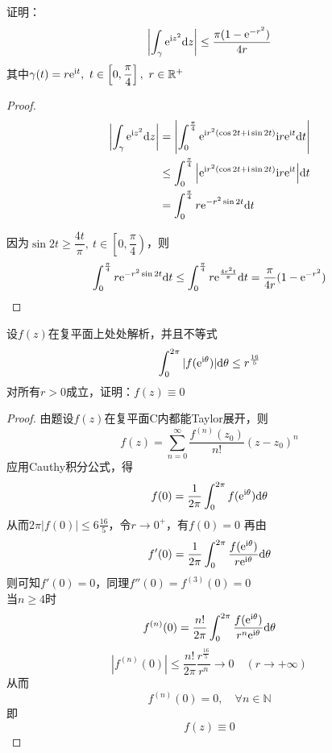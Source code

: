 \begin{proposition}

    证明：
    $$\left| \int_{\gamma}{\mathrm{e}^{\mathrm{i} z^2}}\mathrm{d} z \right| \leq \dfrac{\pi(1 - \mathrm{e}^{-r^2})}{4r}$$
    其中$\gamma(t) = r\mathrm{e}^{\mathrm{i} t},\ t\in \left[0,\dfrac{\pi}{4} \right],\ r \in \mathbb{R}^+$

\end{proposition}

\begin{proof}

    \begin{align*}
        \left| \int_{\gamma}{\mathrm{e}^{\mathrm{i} z^2}}\mathrm{d} z \right| & = \left| \int_{0}^{\frac{\pi}{4}}{\mathrm{e}^{\mathrm{i} r^2(\cos{2t} + \mathrm{i}\sin{2t})}\mathrm{i} r\mathrm{e}^{\mathrm{i} t}}\mathrm{d} t \right| \\
        & \leq \int_{0}^{\frac{\pi}{4}}{\left| \mathrm{e}^{\mathrm{i} r^2(\cos{2t} + \mathrm{i}\sin{2t})}\mathrm{i} r\mathrm{e}^{\mathrm{i} t} \right|}\mathrm{d} t \\
        & = \int_{0}^{\frac{\pi}{4}}{r\mathrm{e}^{-r^2\sin{2t}}}\mathrm{d} t
    \end{align*}

    因为$\sin{2t} \geq \dfrac{4t}{\pi}, \ t \in \left[0,\dfrac{\pi}{4} \right)$，则
    $$\int_{0}^{\frac{\pi}{4}}{r\mathrm{e}^{-r^2\sin{2t}}}\mathrm{d} t \leq \int_{0}^{\frac{\pi}{4}}{r\mathrm{e}^{\frac{4r^2t}{\pi}}}\mathrm{d} t = \dfrac{\pi}{4r}(1 - \mathrm{e}^{-r^2}) $$

\end{proof}

\begin{proposition}

    设$f(z)$在复平面上处处解析，并且不等式
    $$\int_{0}^{2\pi}{|f(\mathrm{e^{\mathrm{i} \theta}})|}\mathrm{d} \theta \leq r^{\frac{16}{5}} $$
    对所有$r > 0$成立，证明：$f(z) \equiv 0$

\end{proposition}

\begin{proof}

    由题设$f(z)$在复平面$\mathrm{C}$内都能\textup{Taylor}展开，则
    $$f(z) = \sum\limits_{n = 0}^{\infty}{\dfrac{f^{(n)}(z_0)}{n!}(z - z_0)^n}$$
    应用\textup{Cauthy}积分公式，得
    $$f(0) = \dfrac{1}{2\pi} \int_{0}^{2\pi}{f(\mathrm{e}^{\mathrm{i} \theta})}\mathrm{d} \theta$$
    从而$2\pi|f(0)| \leq 6{\frac{16}{5}}$，令$r \to 0^{+}$，有$f(0) = 0$
    再由
    $$f'(0) = \dfrac{1}{2\pi} \int_{0}^{2\pi}{\dfrac{f(\mathrm{e}^{\mathrm{i} \theta})}{r\mathrm{e}^{\mathrm{i} \theta}}}\mathrm{d} \theta$$
    则可知$f'(0) = 0$，同理$f''(0) = f^{(3)}(0) = 0$\\
    当$n \geq 4$时
    $$f^{(n)}(0) =  \dfrac{n!}{2\pi} \int_{0}^{2\pi}{\dfrac{f(\mathrm{e}^{\mathrm{i}\theta})}{r^n \mathrm{e}^{\mathrm{i}\theta}}}\mathrm{d} \theta$$
    $$|f^{(n)}(0)| \leq \dfrac{n!}{2\pi} \dfrac{r^{\frac{16}{5}}}{r^n} \to 0 \quad (r \to + \infty)$$
    从而
    $$f^{(n)}(0) = 0,\quad \forall n \in \mathbb{N}$$
    即
    $$f(z) \equiv 0$$
    
\end{proof}

